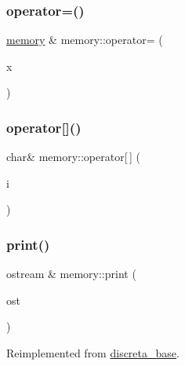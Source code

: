 \subsubsection{\texorpdfstring{operator=()}{operator=()}}
{\footnotesize\ttfamily \mbox{\hyperlink{classmemory}{memory}} \& memory\+::operator= (\begin{DoxyParamCaption}\item[{const \mbox{\hyperlink{classdiscreta__base}{discreta\+\_\+base}} \&}]{x }\end{DoxyParamCaption})}

\mbox{\label{classmemory_adca93ab84b9c609f5ee78b00ea7cac4d}} 
\subsubsection{\texorpdfstring{operator[]()}{operator[]()}}
{\footnotesize\ttfamily char\& memory\+::operator\mbox{[}$\,$\mbox{]} (\begin{DoxyParamCaption}\item[{\mbox{\hyperlink{galois_8h_a09fddde158a3a20bd2dcadb609de11dc}{I\+NT}}}]{i }\end{DoxyParamCaption})\hspace{0.3cm}{\ttfamily [inline]}}

\mbox{\label{classmemory_a76e54475a51795259a3ebf1013a2559e}} 
\subsubsection{\texorpdfstring{print()}{print()}}
{\footnotesize\ttfamily ostream \& memory\+::print (\begin{DoxyParamCaption}\item[{ostream \&}]{ost }\end{DoxyParamCaption})\hspace{0.3cm}{\ttfamily [virtual]}}



Reimplemented from \mbox{\hyperlink{classdiscreta__base_a036e48bc058347046fc9b73dd0951478}{discreta\+\_\+base}}.

\mbox{\label{classmemory_ae96d2ffc64b3b3012960aae45f4c2a5b}} 
